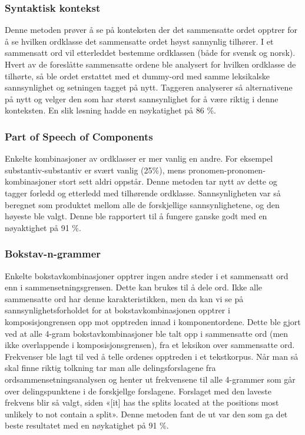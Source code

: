 \subsubsection{Syntaktisk kontekst}

Denne metoden prøver å se på konteksten der det sammensatte ordet opptrer for å se hvilken ordklasse det sammensatte ordet høyst sannynlig tilhører. I et sammensatt ord vil etterleddet bestemme ordklassen (både for svensk og norsk). Hvert av de foreslåtte sammensatte ordene ble analysert for hvilken ordklasse de tilhørte, så ble ordet erstattet med et dummy-ord med samme leksikalske sannsynlighet og setningen tagget på nytt. Taggeren analyserer så alternativene på nytt og velger den som har størst sannsynlighet for å være riktig i denne konteksten. En slik løsning hadde en nøykatighet på 86 \%.

\subsubsection{Part of Speech of Components}

Enkelte kombinasjoner av ordklasser er mer vanlig en andre. For eksempel substantiv-substantiv er svært vanlig (25\%), mens pronomen-pronomen-kombinasjoner stort sett aldri oppstår. Denne metoden tar nytt av dette og tagger forledd og etterledd med tilhørende ordklasse. Sannsynligheten var så beregnet som produktet mellom alle de forskjellige sannsynlighetene, og den høyeste ble valgt. Denne ble rapportert til å fungere ganske godt med en nøyaktighet på 91 \%.

\subsubsection{Bokstav-n-grammer}

Enkelte bokstavkombinasjoner opptrer ingen andre steder i et sammensatt ord enn i sammensetningsgrensen. Dette kan brukes til å dele ord. Ikke alle sammensatte ord har denne karakteristikken, men da kan vi se på sannsynlighetsforholdet for at bokstavkombinasjonen opptrer i komposisjongrensen opp mot opptreden innad i komponentordene. Dette ble gjort ved at alle 4-gram bokstavkombinasjoner ble talt opp i sammensatte ord (men ikke overlappende i komposisjonsgrensen), fra et leksikon over sammensatte ord. Frekvenser ble lagt til ved å telle ordenes opptreden i et tekstkorpus. Når man så skal finne riktig tolkning tar man alle delingsforslagene fra ordsammensetningsanalysen og henter ut frekvensene til alle 4-grammer som går over delingspunktene i de forskjellge forslagene. Forslaget med den laveste frekvens blir så valgt, siden «[it] has the splits located at the positions most unlikely to not contain a split»\cite{sjobergh2004finding}. Denne metoden fant de ut var den som ga det beste resultatet med en nøykatighet på 91 \%. 

